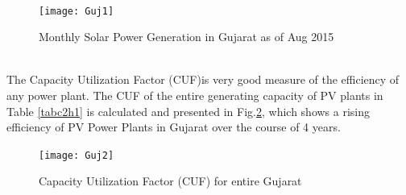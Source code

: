 \\
\begin{figure}[H]
\centering
\texttt{[image: Guj1]}
\caption{Monthly Solar Power Generation in Gujarat as of Aug 2015}
\label{figc2h2} %
\end{figure}
\\
The Capacity Utilization Factor (CUF)is very good measure of the efficiency of any power plant. The CUF of the entire generating capacity of PV plants in Table  \ref{tabc2h1} is calculated and presented in Fig.\ref{figc2h3}, which shows a rising efficiency of PV Power Plants in Gujarat over the course of 4 years.
\\

\begin{figure}[H]
\centering
\texttt{[image: Guj2]}
\caption{Capacity Utilization Factor (CUF) for entire Gujarat}
\label{figc2h3} %
\end{figure}

\newpage


